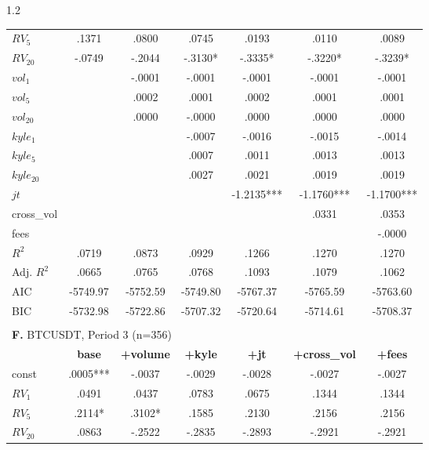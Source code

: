 \documentclass[10pt]{article}
\begin{document}
\begin{setstretch}{1.2}
\begin{small}
\begin{longtable}{l*{6}{c}}
$RV_5$ & \hfil .1371 & \hfil .0800 & \hfil .0745 & \hfil .0193 & \hfil .0110 & \hfil .0089 \\
$RV_{20}$ & \hfil -.0749 & \hfil -.2044 & \hfil -.3130* & \hfil -.3335* & \hfil -.3220* & \hfil -.3239* \\
$vol_1$ & & \hfil -.0001 & \hfil -.0001 & \hfil -.0001 & \hfil -.0001 & \hfil -.0001 \\
$vol_5$ & & \hfil .0002 & \hfil .0001 & \hfil .0002 & \hfil .0001 & \hfil .0001 \\
$vol_{20}$ & & \hfil .0000 & \hfil -.0000 & \hfil .0000 & \hfil .0000 & \hfil .0000 \\
$kyle_1$ & & & \hfil -.0007 & \hfil -.0016 & \hfil -.0015 & \hfil -.0014 \\
$kyle_5$ & & & \hfil .0007 & \hfil .0011 & \hfil .0013 & \hfil .0013 \\
$kyle_{20}$ & & & \hfil .0027 & \hfil .0021 & \hfil .0019 & \hfil .0019 \\
$jt$ & & & & \hfil -1.2135*** & \hfil -1.1760*** & \hfil -1.1700*** \\
cross\_vol & & & & & \hfil .0331 & \hfil .0353 \\
fees & & & & & & \hfil -.0000 \\
\hline
$R^2$ & \hfil .0719 & \hfil .0873 & \hfil .0929 & \hfil .1266 & \hfil .1270 & \hfil .1270 \\
Adj. $R^2$ & \hfil .0665 & \hfil .0765 & \hfil .0768 & \hfil .1093 & \hfil .1079 & \hfil .1062 \\
AIC & \hfil -5749.97 & \hfil -5752.59 & \hfil -5749.80 & \hfil -5767.37 & \hfil -5765.59 & \hfil -5763.60 \\
BIC & \hfil -5732.98 & \hfil -5722.86 & \hfil -5707.32 & \hfil -5720.64 & \hfil -5714.61 & \hfil -5708.37 \\
\hline
\\[2pt]
\multicolumn{7}{l}{\textbf{F.} BTCUSDT, Period 3 (n=356)} \\
& \textbf{base} & \textbf{+volume} & \textbf{+kyle} & \textbf{+jt} & \textbf{+cross\_vol} & \textbf{+fees} \\
\hline
const & \hfil .0005*** & \hfil -.0037 & \hfil -.0029 & \hfil -.0028 & \hfil -.0027 & \hfil -.0027 \\
$RV_1$ & \hfil .0491 & \hfil .0437 & \hfil .0783 & \hfil .0675 & \hfil .1344 & \hfil .1344 \\
$RV_5$ & \hfil .2114* & \hfil .3102* & \hfil .1585 & \hfil .2130 & \hfil .2156 & \hfil .2156 \\
$RV_{20}$ & \hfil .0863 & \hfil -.2522 & \hfil -.2835 & \hfil -.2893 & \hfil -.2921 & \hfil -.2921 \\

\end{longtable}
\end{small}
\end{setstretch}
\end{document}

